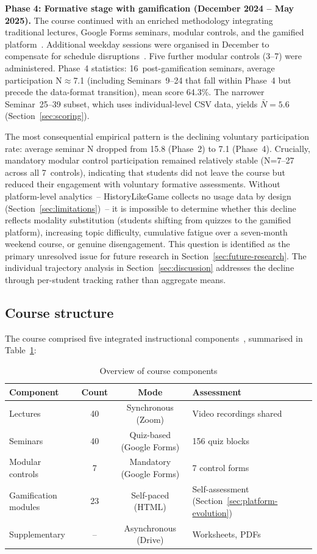 \textbf{Phase 4: Formative stage with gamification (December 2024 -- May 2025).} The course continued with an enriched methodology integrating traditional lectures, Google Forms seminars, modular controls, and the gamified platform~\cite{KorniienkoSemerikov2024, Titova2025cte}. Additional weekday sessions were organised in December to compensate for schedule disruptions~\cite{Martynets202428}. Five further modular controls (3--7) were administered. Phase~4 statistics: 16~post-gamification seminars, average participation N$\approx$7.1 (including Seminars~9--24 that fall within Phase~4 but precede the data-format transition), mean score 64.3\%. The narrower Seminar~25--39 subset, which uses individual-level CSV data, yields $\bar{\textit{N}}\!=\!5.6$ (Section~\ref{sec:scoring}).

The most consequential empirical pattern is the declining voluntary participation rate: average seminar N dropped from 15.8 (Phase~2) to 7.1 (Phase~4). Crucially, mandatory modular control participation remained relatively stable (N=7--27 across all 7~controls), indicating that students did not leave the course but reduced their engagement with voluntary formative assessments. Without platform-level analytics~-- HistoryLikeGame collects no usage data by design (Section~\ref{sec:limitations})~-- it is impossible to determine whether this decline reflects modality substitution (students shifting from quizzes to the gamified platform), increasing topic difficulty, cumulative fatigue over a seven-month weekend course, or genuine disengagement. This question is identified as the primary unresolved issue for future research in Section~\ref{sec:future-research}. The individual trajectory analysis in Section~\ref{sec:discussion} addresses the decline through per-student tracking rather than aggregate means.

\subsection{Course structure}

The course comprised five integrated instructional components~\cite{Bonwell1991, Tamim2011, Flores-Bueno2021}, summarised in Table~\ref{tab:course-components}:

\begin{table}[!h]
\centering
\caption{Overview of course components}
\label{tab:course-components}
\small
\begin{tabular}{lccl}
\hline
\textbf{Component} & \textbf{Count} & \textbf{Mode} & \textbf{Assessment} \\
\hline
Lectures & 40 & Synchronous (Zoom) & Video recordings shared \\
Seminars & 40 & Quiz-based (Google Forms) & 156 quiz blocks \\
Modular controls & 7 & Mandatory (Google Forms) & 7 control forms \\
Gamification modules & 23 & Self-paced (HTML) & Self-assessment (Section~\ref{sec:platform-evolution}) \\
Supplementary & -- & Asynchronous (Drive) & Worksheets, PDFs \\
\hline
\end{tabular}
\end{table}

